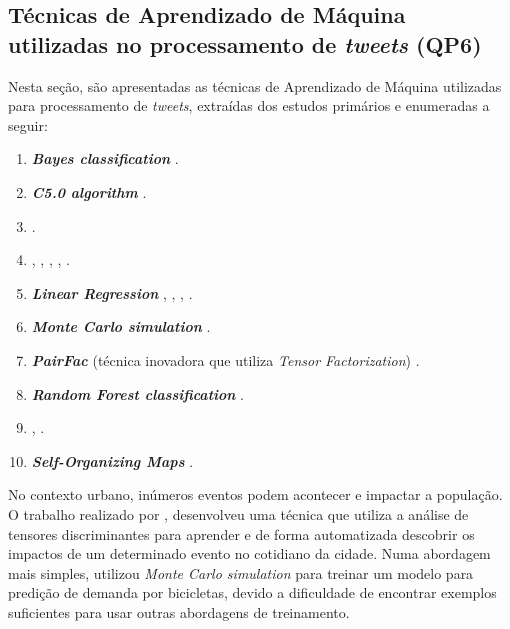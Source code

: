 \documentclass[
	12pt,				%
	oneside,			%
	a4paper,			%
	english,			%
	brazil				%
	]{abntex2ppgsi}
\begin{document}
\subsection{Técnicas de Aprendizado de Máquina utilizadas no processamento de \textit{tweets} (QP6)}
\label{iaClassification}
Nesta seção, são apresentadas as técnicas de Aprendizado de Máquina utilizadas para processamento de \textit{tweets}, extraídas dos estudos primários e enumeradas a seguir:

\begin{enumerate}
\item \textit{\textbf{Bayes classification}} \cite{Mata2015}.
\item \textit{\textbf{C5.0 algorithm}} \cite{Zagal2016}.
\item {} \cite{Anantharam2015}.
\item {} \cite{Farseev2015}, \cite{Abbasi2015}, \cite{Hasan2014}, \cite{DiLorenzo2013}, \cite{Ni2016} .
\item \textit{\textbf{Linear Regression}} \cite{Gutev2016}, \cite{Bendler2014}, \cite{Ni2016}, \cite{Guo2016}.
\item \textit{\textbf{Monte Carlo simulation}} \cite{Chen2016}.
\item \textbf{\textit{PairFac}} (técnica inovadora que utiliza \textit{Tensor Factorization}) \cite{Wen2016}.
\item \textit{\textbf{Random Forest classification}} \cite{Farseev2015}.
\item {} \cite{Mukherjee2015}, \cite{Gal-Tzur2014}.
\item \textit{\textbf{Self-Organizing Maps}} \cite{Frias-Martinez2014}.
\end{enumerate}

No contexto urbano, inúmeros eventos podem acontecer e impactar a população. O trabalho realizado por \cite{Wen2016}, desenvolveu uma técnica que utiliza a análise de tensores discriminantes para aprender e de forma automatizada descobrir os impactos de um determinado evento no cotidiano da cidade. Numa abordagem mais simples, \cite{Chen2016} utilizou \textit{Monte Carlo simulation} para treinar um modelo para predição de demanda por bicicletas, devido a dificuldade de encontrar exemplos suficientes para usar outras abordagens de treinamento. 
\end{document}
